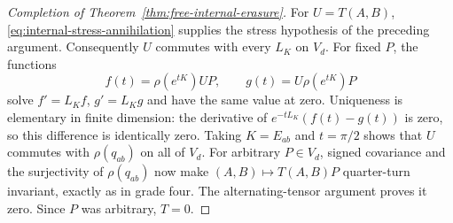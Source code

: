 \begin{proof}[Completion of Theorem~\ref{thm:free-internal-erasure}]
For $U=T(A,B)$, \eqref{eq:internal-stress-annihilation} supplies the
stress hypothesis of the preceding argument. Consequently $U$ commutes
with every $L_K$ on $V_d$. For fixed $P$, the functions
\[
 f(t)=\rho(e^{tK})UP,\qquad g(t)=U\rho(e^{tK})P
\]
solve $f'=L_Kf$, $g'=L_Kg$ and have the same value at zero.
Uniqueness is elementary in finite dimension: the derivative of
$e^{-tL_K}(f(t)-g(t))$ is zero, so this difference is identically zero.
Taking $K=E_{ab}$ and $t=\pi/2$ shows that $U$ commutes with
$\rho(q_{ab})$ on all of $V_d$. For arbitrary $P\in V_d$, signed
covariance and the surjectivity of $\rho(q_{ab})$ now make
$(A,B)\mapsto T(A,B)P$ quarter-turn invariant, exactly as in grade four.
The alternating-tensor argument proves it zero. Since $P$ was arbitrary,
$T=0$.
\end{proof}
